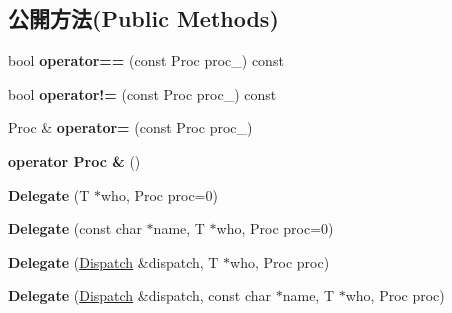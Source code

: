 \subsection*{公開方法(Public Methods)}
\begin{DoxyCompactItemize}
\item 
bool {\bfseries operator==} (const Proc proc\+\_\+) const \hypertarget{class_i_dream_sky_1_1_delegate_ad5e7dc15d192cbac7dee5ed63ff05dd8}{}\label{class_i_dream_sky_1_1_delegate_ad5e7dc15d192cbac7dee5ed63ff05dd8}

\item 
bool {\bfseries operator!=} (const Proc proc\+\_\+) const \hypertarget{class_i_dream_sky_1_1_delegate_a94c060b73735473c00407bad8e1e56c3}{}\label{class_i_dream_sky_1_1_delegate_a94c060b73735473c00407bad8e1e56c3}

\item 
Proc \& {\bfseries operator=} (const Proc proc\+\_\+)\hypertarget{class_i_dream_sky_1_1_delegate_a15c8b001fd1aaf872eb585816672c4b0}{}\label{class_i_dream_sky_1_1_delegate_a15c8b001fd1aaf872eb585816672c4b0}

\item 
{\bfseries operator Proc \&} ()\hypertarget{class_i_dream_sky_1_1_delegate_af0b3818bcc8361f96478f1c14cb07ab2}{}\label{class_i_dream_sky_1_1_delegate_af0b3818bcc8361f96478f1c14cb07ab2}

\item 
{\bfseries Delegate} (T $\ast$who, Proc proc=0)\hypertarget{class_i_dream_sky_1_1_delegate_a8366eb018075edad55be84b599396c42}{}\label{class_i_dream_sky_1_1_delegate_a8366eb018075edad55be84b599396c42}

\item 
{\bfseries Delegate} (const char $\ast$name, T $\ast$who, Proc proc=0)\hypertarget{class_i_dream_sky_1_1_delegate_a0442a9b105b2d758db65fa2998a4eca3}{}\label{class_i_dream_sky_1_1_delegate_a0442a9b105b2d758db65fa2998a4eca3}

\item 
{\bfseries Delegate} (\hyperlink{class_i_dream_sky_1_1_dispatch}{Dispatch} \&dispatch, T $\ast$who, Proc proc)\hypertarget{class_i_dream_sky_1_1_delegate_a892d2ef26bd02c7d042ffb3b4619507b}{}\label{class_i_dream_sky_1_1_delegate_a892d2ef26bd02c7d042ffb3b4619507b}

\item 
{\bfseries Delegate} (\hyperlink{class_i_dream_sky_1_1_dispatch}{Dispatch} \&dispatch, const char $\ast$name, T $\ast$who, Proc proc)\hypertarget{class_i_dream_sky_1_1_delegate_a728962e896f1df56d9e506ffc17b5e5d}{}\label{class_i_dream_sky_1_1_delegate_a728962e896f1df56d9e506ffc17b5e5d}


\end{DoxyCompactItemize}
